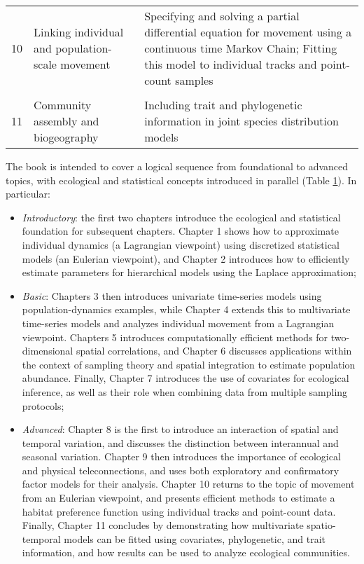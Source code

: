 \begin{table}
\begin{center}
\begin{tabularx}{\textwidth}{ | X m{2.25in} m{2.5in} | }
  10 & Linking individual and population-scale movement  & Specifying and solving a partial differential equation for movement using a continuous time Markov Chain;  Fitting this model to individual tracks and point-count samples \\ & & \\

  11 & Community assembly and biogeography & Including trait and phylogenetic information in joint species distribution models \\ 
  \hline
\end{tabularx}
  \label{tab:Chap0_chapters}
\end{center}
\end{table}

The book is intended to cover a logical sequence from foundational to advanced topics, with ecological and statistical concepts introduced in parallel (Table \ref{tab:Chap0_chapters}).  In particular:
\begin{itemize}
    \item \textit{Introductory}: the first two chapters introduce the ecological and statistical foundation for subsequent chapters.  Chapter 1 shows how to approximate individual dynamics (a Lagrangian viewpoint) using discretized statistical models (an Eulerian viewpoint), and Chapter 2 introduces how to efficiently estimate parameters for hierarchical models using the Laplace approximation;  

    \item \textit{Basic}: Chapters 3 then introduces univariate time-series models using population-dynamics examples, while Chapter 4 extends this to multivariate time-series models and analyzes individual movement from a Lagrangian viewpoint.  Chapters 5 introduces computationally efficient methods for two-dimensional spatial correlations, and Chapter 6 discusses applications within the context of sampling theory and spatial integration to estimate population abundance.  Finally, Chapter 7 introduces the use of covariates for ecological inference, as well as their role when combining data from multiple sampling protocols;  
 
    \item \textit{Advanced}: Chapter 8 is the first to introduce an interaction of spatial and temporal variation, and discusses the distinction between interannual and seasonal variation. Chapter 9 then introduces the importance of ecological and physical teleconnections, and uses both exploratory and confirmatory factor models for their analysis.  Chapter 10 returns to the topic of movement from an Eulerian viewpoint, and presents efficient methods to estimate a habitat preference function using individual tracks and point-count data.  Finally, Chapter 11 concludes by demonstrating how multivariate spatio-temporal models can be fitted using covariates, phylogenetic, and trait information, and how results can be used to analyze ecological communities.  
\end{itemize}    
